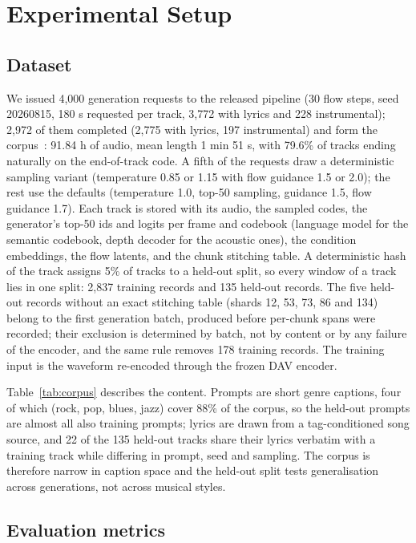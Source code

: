\section{Experimental Setup}
\label{sec:setup}

\subsection{Dataset}

We issued 4,000 generation requests to the released pipeline (30 flow steps, seed 20260815, 180 s requested per track, 3,772 with lyrics and 228 instrumental); 2,972 of them completed (2,775 with lyrics, 197 instrumental) and form the corpus~\cite{Bghira2026dataset}: 91.84 h of audio, mean length 1 min 51 s, with 79.6\% of tracks ending naturally on the end-of-track code. A fifth of the requests draw a deterministic sampling variant (temperature 0.85 or 1.15 with flow guidance 1.5 or 2.0); the rest use the defaults (temperature 1.0, top-50 sampling, guidance 1.5, flow guidance 1.7). Each track is stored with its audio, the sampled codes, the generator's top-50 ids and logits per frame and codebook (language model for the semantic codebook, depth decoder for the acoustic ones), the condition embeddings, the flow latents, and the chunk stitching table. A deterministic hash of the track assigns 5\% of tracks to a held-out split, so every window of a track lies in one split: 2,837 training records and 135 held-out records. The five held-out records without an exact stitching table (shards 12, 53, 73, 86 and 134) belong to the first generation batch, produced before per-chunk spans were recorded; their exclusion is determined by batch, not by content or by any failure of the encoder, and the same rule removes 178 training records. The training input is the waveform re-encoded through the frozen DAV encoder.

Table~\ref{tab:corpus} describes the content. Prompts are short genre captions, four of which (rock, pop, blues, jazz) cover 88\% of the corpus, so the held-out prompts are almost all also training prompts; lyrics are drawn from a tag-conditioned song source, and 22 of the 135 held-out tracks share their lyrics verbatim with a training track while differing in prompt, seed and sampling. The corpus is therefore narrow in caption space and the held-out split tests generalisation across generations, not across musical styles.



\subsection{Evaluation metrics}

